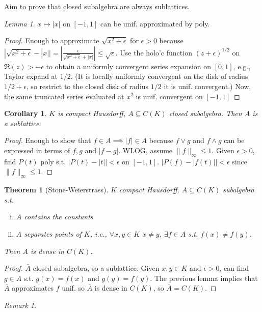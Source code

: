 \documentclass{article}
\theoremstyle{definition}
\theoremstyle{remark}
\newtheorem{rem}{Remark}
\newtheorem{lem}[defn]{Lemma}
\theoremstyle{plain}
\newtheorem{thm}[defn]{Theorem}
\newtheorem{crly}[defn]{Corollary}
\begin{document}
Aim to prove that closed subalgebra are always sublattices.
\begin{lem}
    $x\mapsto |x|$ on $[-1,1]$ can be unif. approximated by poly.
\end{lem}
\begin{proof}
    Enough to approximate $\sqrt{x^2+\epsilon}$ for $\epsilon>0$ because $|\sqrt{x^2+\epsilon}-|x||=|\frac{\epsilon}{\sqrt{x^2+\epsilon}+|x|}|\le \sqrt\epsilon$.
    Use the holo'c function $(z+\epsilon)^{1/2}$ on $\Re(z)>-\epsilon$ to obtain a uniformly convergent series expansion on $[0,1]$, e.g., Taylor expand at $1/2$. (It is locally uniformly convergent on the disk of radius $1/2+\epsilon$, so restrict to the closed disk of radius $1/2$ it is unif. convergent.) Now, the same truncated series evaluated at $x^2$ is unif. convergent on $[-1,1]$
\end{proof}
\begin{crly}
    $K$ is compact Hausdorff, $A\subseteq C(K)$ closed subalgebra. Then $A$ is a sublattice.
\end{crly}
\begin{proof}
    Enough to show that $f\in A\implies |f|\in A$ because $f\vee g$ and $f\wedge g$ can be expressed in terms of $f,g$ and $|f-g|$. WLOG, assume $\|f\|_\infty\le 1$. Given $\epsilon>0$, find $P(t)$ poly s.t. $|P(t)-|t||<\epsilon$ on $[-1,1]$. $|P(f)-|f(t)||<\epsilon$ since $\|f\|_\infty\le 1$.
\end{proof}
\begin{thm}[Stone-Weierstrass]
    $K$ compact Hausdorff. $A\subseteq C(K)$ subalgebra s.t. \begin{enumerate}[(i)]
        \item $A$ contains the constants
        \item $A$ separates points of $K$, i.e., $\forall x,y\in K$ $x\neq y$, $\exists f\in A$ s.t. $f(x)\neq f(y)$.
    \end{enumerate}
    Then $A$ is dense in $C(K)$.
\end{thm}
\begin{proof}
    $\bar A$ closed subalgebra, so a sublattice. Given $x,y\in K$ and $\epsilon>0$, can find $g\in A$ s.t. $g(x)=f(x)$ and $g(y)=f(y)$. The previous lemma implies that $\bar A$ approximates $f$ unif. so $\bar A$ is dense in $C(K)$, so $\bar A=C(K)$.
\end{proof}
\begin{rem}
    
\end{rem}
\end{document}
